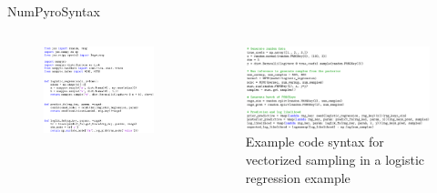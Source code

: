 \documentclass[AERbeamer%
              ,optEnglish%
              ,optBiber%
              ,optBibstyleAlphabetic%
              ,optBeamerClassicFormat%
              ]{AERlatex}%
\begin{document}
\begin{frame}[c]{NumPyro}{Syntax}
    \centering
    \begin{columns}[T]
        \begin{column}{0.48\textwidth}
            \centering
            \begin{figure}
                \centering
                \includegraphics[width=\textwidth]{NumPyroSyntax1.png}
            \end{figure}
        \end{column}
        \begin{column}{0.48\textwidth}
            \centering
            \begin{figure}
                \centering
                \includegraphics[width=\textwidth]{NumPyroSyntax2.png}
                \vspace{1cm}
                \caption{Example code syntax for vectorized sampling in a logistic regression example}
            \end{figure}
        \end{column}
    \end{columns}
\end{frame}
\end{document}
